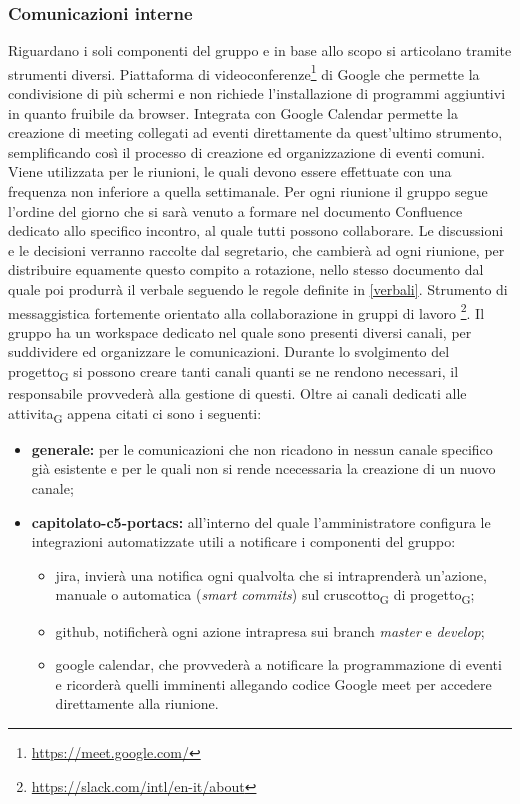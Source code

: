     \subsubsection{Comunicazioni interne}
        Riguardano i soli componenti del gruppo \group e in base allo scopo si articolano tramite strumenti diversi.
            Piattaforma di videoconferenze\footnote{\url{https://meet.google.com/}} di Google che permette la condivisione di più schermi e non richiede l'installazione di programmi aggiuntivi in quanto fruibile da browser. Integrata con Google Calendar permette la creazione di meeting collegati ad eventi direttamente da quest'ultimo strumento, semplificando così il processo di creazione ed organizzazione di eventi comuni.
            Viene utilizzata per le riunioni, le quali devono essere effettuate con una frequenza non inferiore a quella settimanale. Per ogni riunione il gruppo segue l'ordine del giorno che si sarà venuto a formare nel documento Confluence dedicato allo specifico incontro, al quale tutti possono collaborare. Le discussioni e le decisioni verranno raccolte dal segretario, che cambierà ad ogni riunione, per distribuire equamente questo compito a rotazione, nello stesso documento dal quale poi produrrà il verbale seguendo le regole definite in \ref{verbali}.
            Strumento di messaggistica fortemente orientato alla collaborazione in gruppi di lavoro \footnote{\url{https://slack.com/intl/en-it/about}}. Il gruppo \group ha un workspace dedicato nel quale sono presenti diversi canali, per suddividere ed organizzare le comunicazioni. Durante lo svolgimento del progetto\textsubscript{G} si possono creare tanti canali quanti se ne rendono necessari, il responsabile provvederà alla gestione di questi. Oltre ai canali dedicati alle attivita\textsubscript{G} appena citati ci sono i seguenti:
            \begin{itemize}
                \item \textbf{generale: }per le comunicazioni che non ricadono in nessun canale specifico già esistente e per le quali non si rende ncecessaria la creazione di un nuovo canale;
                \item \textbf{capitolato-c5-portacs: }all'interno del quale l'amministratore configura le integrazioni automatizzate utili a notificare i componenti del gruppo:
                \begin{itemize}
                    \item jira, invierà una notifica ogni qualvolta che si intraprenderà un'azione, manuale o automatica (\textit{smart commits}) sul cruscotto\textsubscript{G} di progetto\textsubscript{G};
                    \item github, notificherà ogni azione intrapresa sui branch \textit{master} e \textit{develop};
                    \item google calendar, che provvederà a notificare la programmazione di eventi e ricorderà quelli imminenti allegando codice Google meet per accedere direttamente alla riunione.
                \end{itemize}
            \end{itemize}
